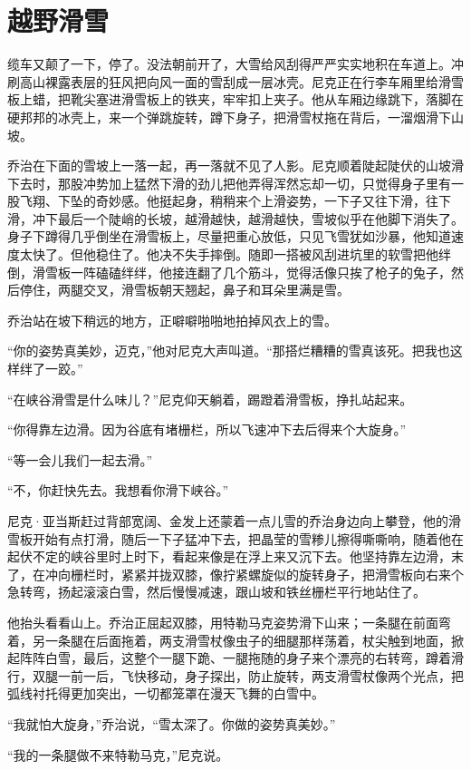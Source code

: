 \section{越野滑雪}
缆车又颠了一下，停了。没法朝前开了，大雪给风刮得严严实实地积在车道上。冲刷高山裸露表层的狂风把向风一面的雪刮成一层冰壳。尼克正在行李车厢里给滑雪板上蜡，把靴尖塞进滑雪板上的铁夹，牢牢扣上夹子。他从车厢边缘跳下，落脚在硬邦邦的冰壳上，来一个弹跳旋转，蹲下身子，把滑雪杖拖在背后，一溜烟滑下山坡。

乔治在下面的雪坡上一落一起，再一落就不见了人影。尼克顺着陡起陡伏的山坡滑下去时，那股冲势加上猛然下滑的劲儿把他弄得浑然忘却一切，只觉得身子里有一股飞翔、下坠的奇妙感。他挺起身，稍稍来个上滑姿势，一下子又往下滑，往下滑，冲下最后一个陡峭的长坡，越滑越快，越滑越快，雪坡似乎在他脚下消失了。身子下蹲得几乎倒坐在滑雪板上，尽量把重心放低，只见飞雪犹如沙暴，他知道速度太快了。但他稳住了。他决不失手摔倒。随即一搭被风刮进坑里的软雪把他绊倒，滑雪板一阵磕磕绊绊，他接连翻了几个筋斗，觉得活像只挨了枪子的兔子，然后停住，两腿交叉，滑雪板朝天翘起，鼻子和耳朵里满是雪。

乔治站在坡下稍远的地方，正噼噼啪啪地拍掉风衣上的雪。

“你的姿势真美妙，迈克，”他对尼克大声叫道。“那搭烂糟糟的雪真该死。把我也这样绊了一跤。”

“在峡谷滑雪是什么味儿？”尼克仰天躺着，踢蹬着滑雪板，挣扎站起来。

“你得靠左边滑。因为谷底有堵栅栏，所以飞速冲下去后得来个大旋身。”

“等一会儿我们一起去滑。”

“不，你赶快先去。我想看你滑下峡谷。”

尼克·亚当斯赶过背部宽阔、金发上还蒙着一点儿雪的乔治身边向上攀登，他的滑雪板开始有点打滑，随后一下子猛冲下去，把晶莹的雪糁儿擦得嘶嘶响，随着他在起伏不定的峡谷里时上时下，看起来像是在浮上来又沉下去。他坚持靠左边滑，末了，在冲向栅栏时，紧紧并拢双膝，像拧紧螺旋似的旋转身子，把滑雪板向右来个急转弯，扬起滚滚白雪，然后慢慢减速，跟山坡和铁丝栅栏平行地站住了。

他抬头看看山上。乔治正屈起双膝，用特勒马克姿势滑下山来；一条腿在前面弯着，另一条腿在后面拖着，两支滑雪杖像虫子的细腿那样荡着，杖尖触到地面，掀起阵阵白雪，最后，这整个一腿下跪、一腿拖随的身子来个漂亮的右转弯，蹲着滑行，双腿一前一后，飞快移动，身子探出，防止旋转，两支滑雪杖像两个光点，把弧线衬托得更加突出，一切都笼罩在漫天飞舞的白雪中。

“我就怕大旋身，”乔治说，“雪太深了。你做的姿势真美妙。”

“我的一条腿做不来特勒马克，”尼克说。

